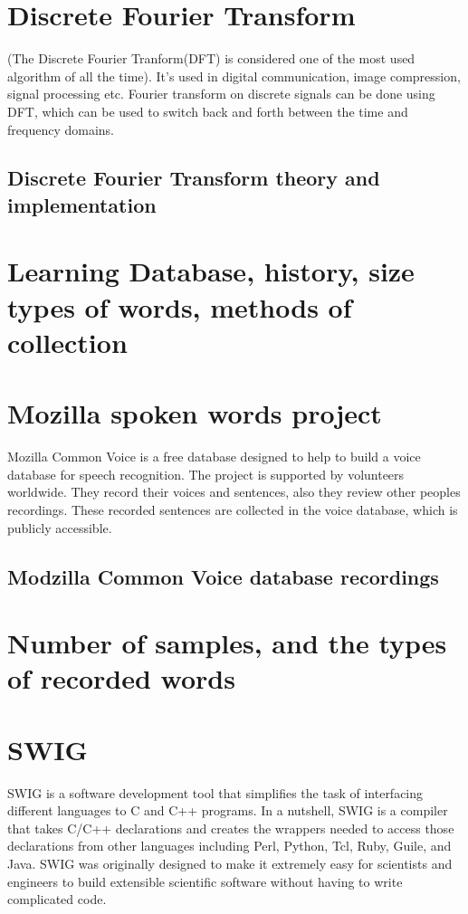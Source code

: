 \documentclass[english,12pt,oneside,a4paper]{article}
\begin{document}
\begin{center}
		\section{Discrete Fourier Transform}
		(The Discrete Fourier Tranform(DFT) is considered one of the most used algorithm of all the time). It's used in digital communication, image compression, signal processing etc. Fourier transform on discrete signals can be done using DFT, which can be used to switch back and forth between the time and frequency domains.
		\subsection{Discrete Fourier Transform theory and implementation}
		
		\section{Learning Database, history, size types of words, methods of collection}
		
		\section{Mozilla spoken words project}
		Mozilla Common Voice is a free database designed to help to build a voice database for speech recognition. The project is supported by volunteers worldwide. They record their voices and sentences, also they review other peoples recordings. These recorded sentences are collected in the voice database, which is publicly accessible.
		\subsection{Modzilla Common Voice database recordings}
		
		\section{Number of samples, and the types of recorded words}
		
		\section{SWIG}
		SWIG is a software development tool that simplifies the task of interfacing different languages to C and C++ programs. In a nutshell, SWIG is a compiler that takes C/C++ declarations and creates the wrappers needed to access those declarations from other languages including Perl, Python, Tcl, Ruby, Guile, and Java. SWIG was originally designed to make it extremely easy for scientists and engineers to build extensible scientific software without having to write complicated code.

\end{center}
\end{document}
